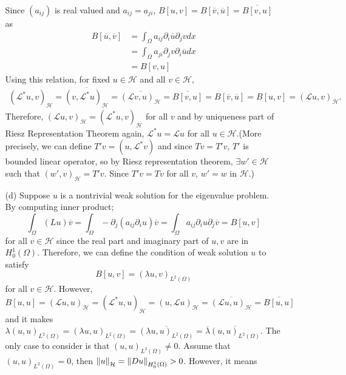 \documentclass{article}
\begin{document}
\begin{enumerate}
\begin{enumerate}
Since $(a_{ij})$ is real valued and $a_{ij}=a_{ji}$, $B[u,v]=B[\overline{v},\overline{u}]=\overline{B[v,u]}$ as
\begin{equation*}
\begin{split}
B[\overline{u},\overline{v}]&=\int_\Omega a_{ij} \partial_i \overline{u}\partial_j v dx \\
&=\int_\Omega a_{ji} \partial_j v \partial_i \overline{u} dx \\
&=B[v,u]
\end{split}
\end{equation*}
Using this relation, for fixed $u\in\mathcal{H}$ and all $v\in \mathcal{H}$,
\begin{equation*}
\begin{split}
(\mathcal{L}^*u, v)_{\mathcal{H}}=\overline{(v,\mathcal{L}^*u)_{\mathcal{H}}}=\overline{(\mathcal{L}v,u)_{\mathcal{H}}}=\overline{B[v,u]}=B[\overline{v},\overline{u}] =B[u,v] =(\mathcal{L}u,v)_{\mathcal{H}}.
\end{split}
\end{equation*}
Therefore, $(\mathcal{L}u,v)_{\mathcal{H}}=(\mathcal{L}^*u,v)_{\mathcal{H}}$ for all $v$ and by uniqueness part of Riesz Representation Theorem again, $\mathcal{L}^*u=\mathcal{L}u$ for all $u\in \mathcal{H}$.(More precisely, we can define $T'v=(u,\mathcal{L}^*v)$ and since $Tv=T'v$, $T'$ is bounded linear operator, so by Riesz representation theorem, $\exists w'\in \mathcal{H}$ such that $(w',v)_\mathcal{H}=T'v$. Since $T'v=Tv$ for all $v$, $w'=w$ in $\mathcal{H}$.)
\item[(d)] Suppose $u$ is a nontrivial weak solution for the eigenvalue problem. By computing inner product;
\begin{equation*}
\int_\Omega (Lu)\overline{v}=\int_\Omega -\partial_j(a_{ij}\partial_i u)\overline{v}=\int_\Omega a_{ij}\partial_i u\partial_j \overline{v}=B[u,v]
\end{equation*}
for all $v\in \mathcal{H}$ since the real part and imaginary part of $u,v$ are in $H^1_0(\Omega)$. Therefore, we can define the condition of weak solution $u$ to satisfy
\begin{equation*}
B[u,v]=(\lambda u,v)_{L^2(\Omega)}
\end{equation*}
for all $v\in\mathcal{H}$. However,
\begin{equation*}
B[u,u]=(\mathcal{L}u,u)_{\mathcal{H}}=(\mathcal{L}^*u,u)_{\mathcal{H}}=(u,\mathcal{L}u)_{\mathcal{H}}=\overline{(\mathcal{L}u,u)_{\mathcal{H}}}=\overline{B[u,u]}
\end{equation*}
and it makes $\lambda(u,u)_{L^2(\Omega)}=(\lambda u,u)_{L^2(\Omega)}=\overline{(\lambda u,u)_{L^2(\Omega)}}=\overline{\lambda}\overline{(u,u)_{L^2(\Omega)}}$. The only case to consider is that $(u,u)_{L^2(\Omega)}\neq 0$. Assume that $(u,u)_{L^2(\Omega)}=0$, then $\norm{u}_{\mathcal{H}}=\norm{Du}_{H^1_0(\Omega)}>0$. However, it means

\end{enumerate}
\end{enumerate}
\end{document}
